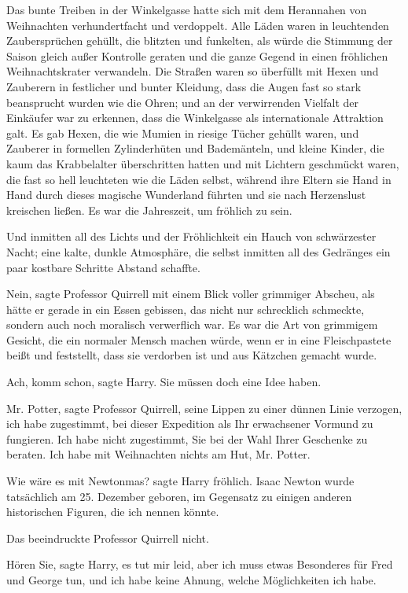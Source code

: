 Das bunte Treiben in der Winkelgasse hatte sich mit dem Herannahen von
Weihnachten verhundertfacht und verdoppelt. Alle Läden waren in leuchtenden
Zaubersprüchen gehüllt, die blitzten und funkelten, als würde die Stimmung der
Saison gleich außer Kontrolle geraten und die ganze Gegend in einen fröhlichen
Weihnachtskrater verwandeln. Die Straßen waren so überfüllt mit Hexen und
Zauberern in festlicher und bunter Kleidung, dass die Augen fast so stark
beansprucht wurden wie die Ohren; und an der verwirrenden Vielfalt der Einkäufer
war zu erkennen, dass die Winkelgasse als internationale Attraktion galt. Es gab
Hexen, die wie Mumien in riesige Tücher gehüllt waren, und Zauberer in formellen
Zylinderhüten und Bademänteln, und kleine Kinder, die kaum das Krabbelalter
überschritten hatten und mit Lichtern geschmückt waren, die fast so hell
leuchteten wie die Läden selbst, während ihre Eltern sie Hand in Hand durch
dieses magische Wunderland führten und sie nach Herzenslust kreischen ließen. Es
war die Jahreszeit, um fröhlich zu sein.

Und inmitten all des Lichts und der Fröhlichkeit ein Hauch von schwärzester
Nacht; eine kalte, dunkle Atmosphäre, die selbst inmitten all des Gedränges ein
paar kostbare Schritte Abstand schaffte.

\glqq{}Nein\grqq{}, sagte Professor Quirrell mit einem Blick voller grimmiger
Abscheu, als hätte er gerade in ein Essen gebissen, das nicht nur schrecklich
schmeckte, sondern auch noch moralisch verwerflich war. Es war die Art von
grimmigem Gesicht, die ein normaler Mensch machen würde, wenn er in eine
Fleischpastete beißt und feststellt, dass sie verdorben ist und aus Kätzchen
gemacht wurde.

\glqq{}Ach, komm schon\grqq{}, sagte Harry. \glqq{}Sie müssen doch eine Idee
haben.\grqq{}

\glqq{}Mr. Potter\grqq{}, sagte Professor Quirrell, seine Lippen zu einer dünnen
Linie verzogen, \glqq{}ich habe zugestimmt, bei dieser Expedition als Ihr
erwachsener Vormund zu fungieren. Ich habe nicht zugestimmt, Sie bei der Wahl
Ihrer Geschenke zu beraten. Ich habe mit Weihnachten nichts am Hut, Mr. Potter.\grqq{}

\glqq{}Wie wäre es mit Newtonmas?\grqq{} sagte Harry fröhlich. \glqq{}Isaac Newton
wurde tatsächlich am 25. Dezember geboren, im Gegensatz zu einigen anderen
historischen Figuren, die ich nennen könnte.\grqq{}

Das beeindruckte Professor Quirrell nicht.

\glqq{}Hören Sie\grqq{}, sagte Harry, \glqq{}es tut mir leid, aber ich muss etwas
Besonderes für Fred und George tun, und ich habe keine Ahnung, welche
Möglichkeiten ich habe.\grqq{}

